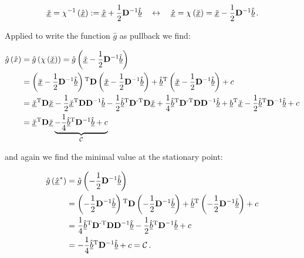 \documentclass[a4paper,10pt]{article}
\begin{document}
\begin{equation}
 \underline{\breve{x}} = \chi^{-1}\left(\underline{\hat{x}}\right) := \underline{\hat{x}} + \frac{1}{2}\mathbf{D}{}^{-1}\underline{\hat{b}}
 \quad \leftrightarrow \quad
 \underline{\hat{x}} = \chi\left(\underline{\breve{x}}\right) = \underline{\breve{x}} - \frac{1}{2}\mathbf{D}{}^{-1}\underline{\hat{b}} \,.
\end{equation}

Applied to write the function $\hat{g}$ as pullback we find:

\begin{equation}
\begin{split}
 \hat{g}\left(\hat{x}\right) & = \hat{g}\left(\chi\left(\underline{\breve{x}}\right)\right)
                               = \hat{g}\left(\underline{\breve{x}} - \frac{1}{2}\mathbf{D}{}^{-1}\underline{\hat{b}}\right) \\
 & = \left(\underline{\breve{x}} - \frac{1}{2}\mathbf{D}{}^{-1}\underline{\hat{b}}\right){}^{\textnormal{T}}
     \mathbf{D}
     \left(\underline{\breve{x}} - \frac{1}{2}\mathbf{D}{}^{-1}\underline{\hat{b}}\right)
     + \underline{\hat{b}}{}^{\textnormal{T}} \left(\underline{\breve{x}} - \frac{1}{2}\mathbf{D}{}^{-1}\underline{\hat{b}}\right)
     + c \\
 & = \underline{\breve{x}}{}^{\textnormal{T}} \mathbf{D} \underline{\breve{x}}
   - \frac{1}{2} \underline{\breve{x}}{}^{\textnormal{T}} \mathbf{D} \mathbf{D}{}^{-1}\underline{\hat{b}}
   - \frac{1}{2} \underline{\hat{b}}{}^{\textnormal{T}}\mathbf{D}{}^{\textnormal{-T}} \mathbf{D} \underline{\breve{x}}
   + \frac{1}{4} \underline{\hat{b}}{}^{\textnormal{T}} \mathbf{D}{}^{\textnormal{-T}} \mathbf{D} \mathbf{D}{}^{-1}\underline{\hat{b}}
   + \underline{b}{}^{\textnormal{T}}\underline{\breve{x}}
   - \frac{1}{2} \underline{\hat{b}}{}^{\textnormal{T}} \mathbf{D}{}^{-1}\underline{\hat{b}}
   + c \\
 & = \underline{\breve{x}}{}^{\textnormal{T}} \mathbf{D} \underline{\breve{x}}
     \underbrace{- \frac{1}{4} \underline{\hat{b}}{}^{\textnormal{T}} \mathbf{D}{}^{-1}\underline{\hat{b}} + c}_{\mathcal{C}}
\end{split}
\end{equation}

and again we find the minimal value at the stationary point:

\begin{equation}
\begin{split}
 \hat{g}\left(\underline{\hat{x}}^{*}\right) & = \hat{g}\left(-\frac{1}{2} \mathbf{D}{}^{-1} \underline{\hat{b}}\right) \\
 & = \left(-\frac{1}{2} \mathbf{D}{}^{-1} \underline{\hat{b}}\right){}^{\textnormal{T}}
     \mathbf{D}
     \left(-\frac{1}{2} \mathbf{D}{}^{-1} \underline{\hat{b}}\right)
     + \underline{\hat{b}}{}^{\textnormal{T}} \left(-\frac{1}{2} \mathbf{D}{}^{-1} \underline{\hat{b}}\right)
     + c \\
 & = \frac{1}{4} \underline{\hat{b}}{}^{\textnormal{T}} \mathbf{D}{}^{\textnormal{-T}}\mathbf{D}\mathbf{D}{}^{-1} \underline{\hat{b}}
     - \frac{1}{2} \underline{\hat{b}}{}^{\textnormal{T}} \mathbf{D}{}^{-1} \underline{\hat{b}}
     + c \\
 & = -\frac{1}{4} \underline{\hat{b}}{}^{\textnormal{T}} \mathbf{D}{}^{-1} \underline{\hat{b}} + c = \mathcal{C} \,.
\end{split}
\end{equation}
\end{document}
